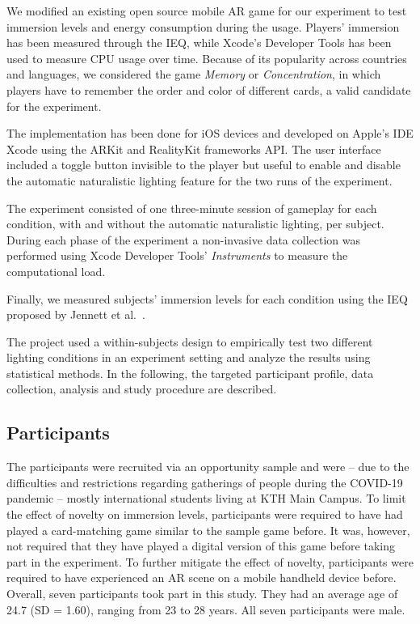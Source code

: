 \documentclass[12pt,twoside,english]{article}
\begin{document}
We modified an existing open source mobile \gls{AR} game for our experiment to test immersion levels and energy consumption during the usage.
Players' immersion has been measured through the \gls{IEQ}, while Xcode's Developer Tools has been used to measure \gls{CPU} usage over time.
Because of its popularity across countries and languages, we considered the game \textit{Memory} or \textit{Concentration}, in which players have to remember the order and color of different cards, a valid candidate for the experiment.

The implementation has been done for iOS devices and developed on Apple's \gls{IDE} Xcode using the ARKit and RealityKit frameworks \gls{API}.
The user interface included a toggle button invisible to the player but useful to enable and disable the automatic naturalistic lighting feature for the two runs of the experiment.

The experiment consisted of one three-minute session of gameplay for each condition, with and without the automatic naturalistic lighting, per subject.
During each phase of the experiment a non-invasive data collection was performed using Xcode Developer Tools' \emph{Instruments} to measure the computational load.

Finally, we measured subjects' immersion levels for each condition using the \gls{IEQ} proposed by Jennett et al.~\cite{jennett_measuring_2008}.

The project used a within-subjects design to empirically test two different lighting conditions in an experiment setting and analyze the results using statistical methods.
In the following, the targeted participant profile, data collection, analysis and study procedure are described.

\subsection{Participants}
\label{sect:participants}

The participants were recruited via an opportunity sample and were -- due to the difficulties and restrictions regarding gatherings of people during the COVID-19 pandemic -- mostly international students living at KTH Main Campus.
To limit the effect of novelty on immersion levels, participants were required to have had played a card-matching game similar to the sample game before.
It was, however, not required that they have played a digital version of this game before taking part in the experiment.
To further mitigate the effect of novelty, participants were required to have experienced an \gls{AR} scene on a mobile handheld device before.
Overall, seven participants took part in this study.
They had an average age of 24.7 (SD = 1.60), ranging from 23 to 28 years.
All seven participants were male.
\end{document}
